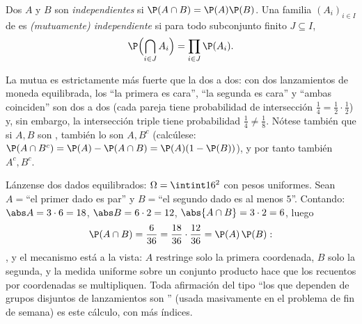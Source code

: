\begin{definition}[Independencia]\label{def:b2:proba:independence}
Dos  $A$ y $B$ son \emph{independientes} si $\P(A \cap B) = \P(A)\P(B)$. Una familia $(A_i)_{i
\in I}$ de  es \emph{(mutuamente) independiente} si para todo
subconjunto finito $J \subseteq I$,
\[
\P\Bigl(\bigcap_{i \in J} A_i\Bigr)
= \prod_{i \in J} \P(A_i) .
\]
\end{definition}

\begin{remark}
La  mutua es estrictamente más fuerte que la
 dos a dos: con dos lanzamientos de moneda equilibrada,
los  ``la primera es cara'', ``la segunda es cara'' y ``ambas
coinciden'' son  dos a dos (cada pareja tiene
probabilidad de intersección $\frac14 = \frac12\cdot\frac12$) y, sin
embargo, la intersección triple tiene probabilidad $\frac14 \neq
\frac18$. Nótese también que si $A, B$ son , también lo
son $A, B^c$ (calcúlese: $\P(A \cap B^c) = \P(A) - \P(A\cap B) =
\P(A)(1 - \P(B))$), y por tanto también $A^c, B^c$.
\end{remark}

\begin{example}\label{ex:b2:proba:productindep}
Lánzense dos dados equilibrados: $\Omega = \intint16^2$ con pesos
uniformes. Sean $A = {}$``el primer dado es par'' y $B = {}$``el
segundo dado es al menos $5$''. Contando: $\abs A = 3\cdot6 = 18$,
$\abs B = 6\cdot2 = 12$, $\abs{A\cap B} = 3\cdot2 = 6$, luego
\[
\P(A\cap B) = \frac6{36} = \frac{18}{36}\cdot\frac{12}{36} =
\P(A)\,\P(B) :
\]
, y el mecanismo está a la vista: $A$ restringe solo la
primera coordenada, $B$ solo la segunda, y la medida uniforme sobre
un conjunto producto hace que los recuentos por coordenadas se
multipliquen. Toda afirmación del tipo ``los  que dependen de
grupos disjuntos de lanzamientos son '' (usada
masivamente en el problema de fin de semana) es este cálculo, con más
índices.
\end{example}

